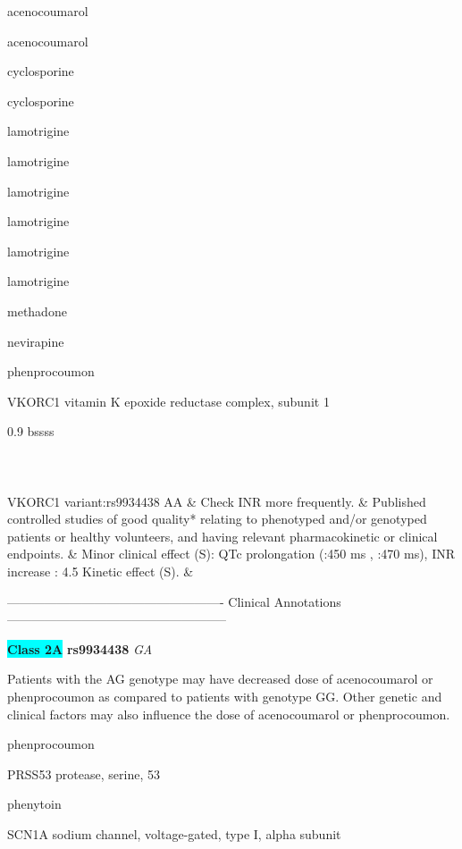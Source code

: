 \documentclass{resume} %
\begin{document}
\begin{rSection}{ acenocoumarol }
\begin{rSection}{ acenocoumarol }
\begin{rSection}{ cyclosporine }
\begin{rSection}{ cyclosporine }
\begin{rSection}{ lamotrigine }
\begin{rSection}{ lamotrigine }
\begin{rSection}{ lamotrigine }
\begin{rSection}{ lamotrigine }
\begin{rSection}{ lamotrigine }
\begin{rSection}{ lamotrigine }
\begin{rSection}{ methadone }
\begin{rSection}{ nevirapine }
\begin{rSection}{ phenprocoumon }
\begin{rSubsection}{ VKORC1 }{ vitamin K epoxide reductase complex, subunit 1 }{}{}
\begin{center}
\begin{tabularx}{0.9\textwidth}{ bssss }
\\
		\vspace{1pt}\\
		\hline \\
		\vspace{1pt}\\
		         VKORC1 variant:rs9934438 AA & Check INR more frequently. & Published controlled studies of good quality* relating to phenotyped and/or genotyped patients or healthy volunteers, and having relevant pharmacokinetic or clinical endpoints. & Minor clinical effect (S): QTc prolongation (:450 ms , :470 ms),  INR increase : 4.5 Kinetic effect (S). &
\\
		\end{tabularx}
		\end{center}
		\normalsize
		\vspace{10pt}
		        
\item[] ---------------------------------------------------- Clinical Annotations -----------------------------------------------------\newline
\item \textbf{\colorbox{cyan} {Class 2A}} \textbf{ rs9934438 } \textit{ GA }
\item[] Patients with the AG genotype may have decreased dose of acenocoumarol or phenprocoumon as compared to patients with genotype GG. Other genetic and clinical factors may also influence the dose of acenocoumarol or phenprocoumon.

\end{rSubsection}
\begin{rSection}{ phenprocoumon }
\item[]
\begin{rSubsection}{ PRSS53 }{ protease, serine, 53 }{}{}
\item[]


\end{rSubsection}

\end{rSection}
\begin{rSection}{ phenytoin }
\item[]
\begin{rSubsection}{ SCN1A }{ sodium channel, voltage-gated, type I, alpha subunit }{}{}
\item[]


\end{rSubsection}


\end{rSection}
\end{rSection}
\end{rSection}
\end{rSection}
\end{rSection}
\end{rSection}
\end{rSection}
\end{rSection}
\end{rSection}
\end{rSection}
\end{rSection}
\end{rSection}
\end{rSection}
\end{rSection}
\end{document}
